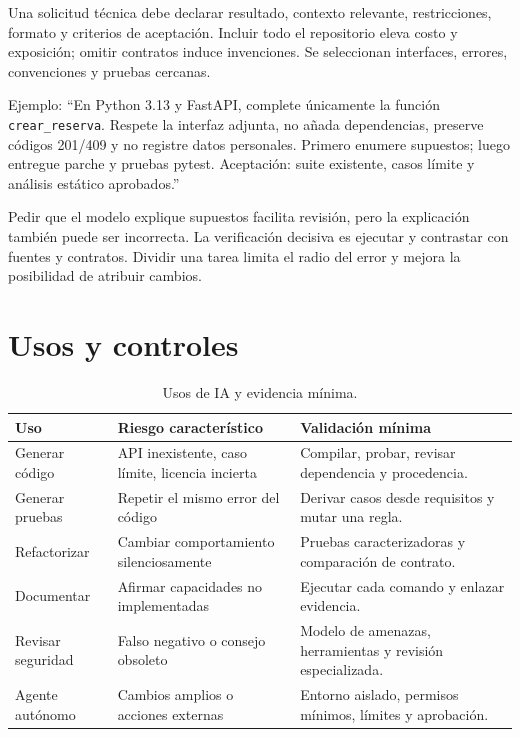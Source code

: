 Una solicitud técnica debe declarar resultado, contexto relevante, restricciones, formato y criterios de aceptación. Incluir todo el repositorio eleva costo y exposición; omitir contratos induce invenciones. Se seleccionan interfaces, errores, convenciones y pruebas cercanas.

\begin{politicaia}
Ejemplo: ``En Python 3.13 y FastAPI, complete únicamente la función \texttt{crear\_reserva}. Respete la interfaz adjunta, no añada dependencias, preserve códigos 201/409 y no registre datos personales. Primero enumere supuestos; luego entregue parche y pruebas pytest. Aceptación: suite existente, casos límite y análisis estático aprobados.''
\end{politicaia}

Pedir que el modelo explique supuestos facilita revisión, pero la explicación también puede ser incorrecta. La verificación decisiva es ejecutar y contrastar con fuentes y contratos. Dividir una tarea limita el radio del error y mejora la posibilidad de atribuir cambios.

\section{Usos y controles}

\begin{table}[htbp]
\centering
\caption{Usos de IA y evidencia mínima.}
\begin{tabularx}{\textwidth}{p{3cm}X X}
\toprule
\textbf{Uso} & \textbf{Riesgo característico} & \textbf{Validación mínima}\\
\midrule
Generar código & API inexistente, caso límite, licencia incierta & Compilar, probar, revisar dependencia y procedencia.\\
Generar pruebas & Repetir el mismo error del código & Derivar casos desde requisitos y mutar una regla.\\
Refactorizar & Cambiar comportamiento silenciosamente & Pruebas caracterizadoras y comparación de contrato.\\
Documentar & Afirmar capacidades no implementadas & Ejecutar cada comando y enlazar evidencia.\\
Revisar seguridad & Falso negativo o consejo obsoleto & Modelo de amenazas, herramientas y revisión especializada.\\
Agente autónomo & Cambios amplios o acciones externas & Entorno aislado, permisos mínimos, límites y aprobación.\\
\bottomrule
\end{tabularx}
\end{table}

